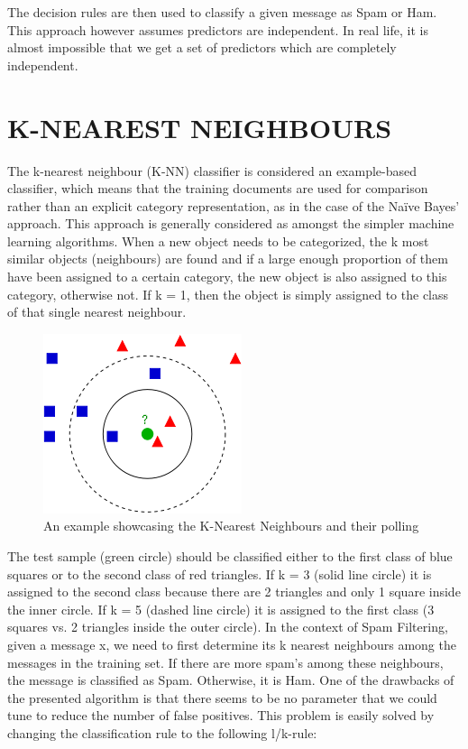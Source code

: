 The decision rules are then used to classify a given message as Spam or Ham. This approach however assumes predictors are independent. In real life, it is almost impossible that we get a set of predictors which are completely independent.

\section{K-NEAREST NEIGHBOURS}
The k-nearest neighbour (K-NN) classifier is considered an example-based classifier, which means that the training documents are used for comparison rather than an explicit category representation, as in the case of the Naïve Bayes’ approach. This approach is generally considered as amongst the simpler machine learning algorithms.
When a new object needs to be categorized, the k most similar objects (neighbours) are found and if a large enough proportion of them have been assigned to a certain category, the new object is also assigned to this category, otherwise not. If k = 1, then the object is simply assigned to the class of that single nearest neighbour. 

\begin{figure}[h]
\centering\includegraphics[width=0.75\linewidth]{knn.png}\caption{An example showcasing the K-Nearest Neighbours and their polling}
\end{figure}

The test sample (green circle) should be classified either to the first class of blue squares or to the second class of red triangles. If k = 3 (solid line circle) it is assigned to the second class because there are 2 triangles and only 1 square inside the inner circle. If k = 5 (dashed line circle) it is assigned to the first class (3 squares vs. 2 triangles inside the outer circle).
In the context of Spam Filtering, given a message x, we need to first determine its k nearest neighbours among the messages in the training set. If there are more spam's among these neighbours, the message is classified as Spam. Otherwise, it is Ham.
One of the drawbacks of the presented algorithm is that there seems to be no parameter that we could tune to reduce the number of false positives. This problem is easily solved by changing the classification rule to the following l/k-rule:

